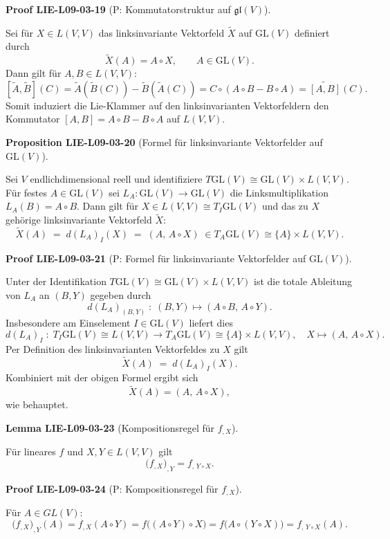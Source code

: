 \documentclass[10pt, letterpaper]{article}
\newcommand{\CustomHeading}[3]{%
  \par\medskip\noindent%
  \textbf{#1 #2} \textnormal{(#3)}.\enskip%
}
\newenvironment{PROP}[2]{\CustomHeading{Proposition}{#1}{#2}}{}
\newenvironment{LEM}[2]{\CustomHeading{Lemma}{#1}{#2}}{}
\newenvironment{PROOF}[2]{\CustomHeading{Proof}{#1}{#2}}{}
\begin{document}
\begin{PROOF}{LIE-L09-03-19}{P: Kommutatorstruktur auf $\mathfrak{gl}(V)$}
Sei für $X\in L(V,V)$ das linksinvariante Vektorfeld
$\widetilde{X}$ auf $\mathrm{GL}(V)$ definiert durch
\[
\widetilde{X}(A)=A\circ X,\qquad A\in\mathrm{GL}(V).
\]
Dann gilt für $A,B\in L(V,V)$:
\[
[\widetilde{A},\widetilde{B}](C)
=
\widetilde{A}(\widetilde{B}(C))-\widetilde{B}(\widetilde{A}(C))
=
C\circ(A\circ B-B\circ A)
=
\widetilde{[A,B]}(C).
\]
Somit induziert die Lie-Klammer auf den linksinvarianten Vektorfeldern
den Kommutator $[A,B]=A\circ B-B\circ A$ auf $L(V,V)$.
\end{PROOF}

\begin{PROP}{LIE-L09-03-20}{Formel für linksinvariante Vektorfelder auf $\mathrm{GL}(V)$}
Sei $V$ endlichdimensional reell und identifiziere $T\mathrm{GL}(V)\cong \mathrm{GL}(V)\times L(V,V)$.
Für festes $A\in \mathrm{GL}(V)$ sei $L_A:\mathrm{GL}(V)\to \mathrm{GL}(V)$ die Linksmultiplikation $L_A(B)=A\circ B$.
Dann gilt für $X\in L(V,V)\cong T_I\mathrm{GL}(V)$ und das zu $X$ gehörige linksinvariante Vektorfeld $\widetilde X$:
\[
\widetilde X(A)\;=\; d(L_A)_I(X)\;=\;(A,\,A\circ X)\;\in T_A\mathrm{GL}(V)\cong \{A\}\times L(V,V).
\]
\end{PROP}

\begin{PROOF}{LIE-L09-03-21}{P: Formel für linksinvariante Vektorfelder auf $\mathrm{GL}(V)$}
Unter der Identifikation $T\mathrm{GL}(V)\cong \mathrm{GL}(V)\times L(V,V)$ ist die totale Ableitung von $L_A$ an $(B,Y)$ gegeben durch
\[
d(L_A)_{(B,Y)}\;:\;(B,Y)\longmapsto (A\circ B,\,A\circ Y).
\]
Insbesondere am Einselement $I\in \mathrm{GL}(V)$ liefert dies
\[
d(L_A)_I \;:\; T_I\mathrm{GL}(V)\cong L(V,V)\longrightarrow T_A\mathrm{GL}(V)\cong \{A\}\times L(V,V),\quad
X\longmapsto (A,\,A\circ X).
\]
Per Definition des linksinvarianten Vektorfeldes zu $X$ gilt
\[
\widetilde X(A)\;=\; d(L_A)_I(X).
\]
Kombiniert mit der obigen Formel ergibt sich
\[
\widetilde X(A)=(A,\,A\circ X),
\]
wie behauptet.
\end{PROOF}

\begin{LEM}{LIE-L09-03-23}{Kompositionsregel für $f_{,X}$}
Für lineares $f$ und $X,Y\in L(V,V)$ gilt
\[
\bigl(f_{,X}\bigr)_{,Y}=f_{,\,Y\circ X}.
\]
\end{LEM}

\begin{PROOF}{LIE-L09-03-24}{P: Kompositionsregel für $f_{,X}$}
Für $A\in GL(V)$:
\[
\bigl(f_{,X}\bigr)_{,Y}(A)=f_{,X}(A\circ Y)=f\bigl((A\circ Y)\circ X\bigr)=f\bigl(A\circ (Y\circ X)\bigr)=f_{,\,Y\circ X}(A).
\]
\end{PROOF}
\end{document}
